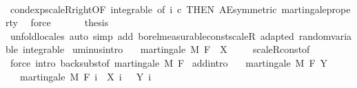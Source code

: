 \begin{isabellebody}
\ \ \ \ \ \ \isamarkupfalse%
\ cond{\isacharunderscore}{\kern0pt}exp{\isacharunderscore}{\kern0pt}scaleR{\isacharunderscore}{\kern0pt}right{\isacharbrackleft}{\kern0pt}OF\ integrable{\isacharcomma}{\kern0pt}\ of\ i\ c{\isacharcomma}{\kern0pt}\ THEN\ AE{\isacharunderscore}{\kern0pt}symmetric{\isacharbrackright}{\kern0pt}\ martingale{\isacharunderscore}{\kern0pt}property\ \isamarkupfalse%
\ force\isanewline
\ \ \isacommand{{\isacharbraceright}{\kern0pt}}\isamarkupfalse%
\isanewline
\ \ \isamarkupfalse%
\ {\isacharquery}{\kern0pt}thesis\ \isamarkupfalse%
\ {\isacharparenleft}{\kern0pt}unfold{\isacharunderscore}{\kern0pt}locales{\isacharparenright}{\kern0pt}\ {\isacharparenleft}{\kern0pt}auto\ simp\ add{\isacharcolon}{\kern0pt}\ borel{\isacharunderscore}{\kern0pt}measurable{\isacharunderscore}{\kern0pt}const{\isacharunderscore}{\kern0pt}scaleR\ adapted\ random{\isacharunderscore}{\kern0pt}variable\ integrable{\isacharparenright}{\kern0pt}\isanewline
{}\isamarkupfalse%
%
\endisatagproof
{\isafoldproof}%
%
\isadelimproof
\isanewline
%
\endisadelimproof
\isanewline
{}\isamarkupfalse%
\ uminus{\isacharbrackleft}{\kern0pt}intro{\isacharbrackright}{\kern0pt}{\isacharcolon}{\kern0pt}\isanewline
\ \ \ {\isachardoublequoteopen}martingale\ M\ F\ {\isacharparenleft}{\kern0pt}{\isacharminus}{\kern0pt}\ X{\isacharparenright}{\kern0pt}{\isachardoublequoteclose}\ \isanewline
%
\isadelimproof
\ \ %
\endisadelimproof
%
\isatagproof
{}\isamarkupfalse%
\ scaleR{\isacharunderscore}{\kern0pt}const{\isacharbrackleft}{\kern0pt}of\ {\isachardoublequoteopen}{\isacharminus}{\kern0pt}{}{\isachardoublequoteclose}{\isacharbrackright}{\kern0pt}\ \isamarkupfalse%
\ {\isacharparenleft}{\kern0pt}force\ intro{\isacharcolon}{\kern0pt}\ back{\isacharunderscore}{\kern0pt}subst{\isacharbrackleft}{\kern0pt}of\ {\isachardoublequoteopen}martingale\ M\ F{\isachardoublequoteclose}{\isacharbrackright}{\kern0pt}{\isacharparenright}{\kern0pt}%
\endisatagproof
{\isafoldproof}%
%
\isadelimproof
\isanewline
%
\endisadelimproof
\isanewline
{}\isamarkupfalse%
\ add{\isacharbrackleft}{\kern0pt}intro{\isacharbrackright}{\kern0pt}{\isacharcolon}{\kern0pt}\isanewline
\ \ \ {\isachardoublequoteopen}martingale\ M\ F\ Y{\isachardoublequoteclose}\isanewline
\ \ \ {\isachardoublequoteopen}martingale\ M\ F\ {\isacharparenleft}{\kern0pt}{\isasymlambda}i\ {\isasymxi}{\isachardot}{\kern0pt}\ X\ i\ {\isasymxi}\ {\isacharplus}{\kern0pt}\ Y\ i\ {\isasymxi}{\isacharparenright}{\kern0pt}{\isachardoublequoteclose}\isanewline

\end{isabellebody}
